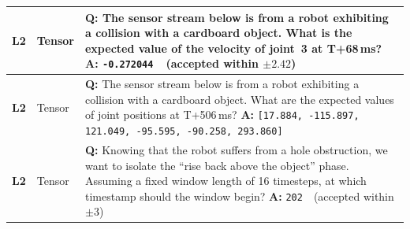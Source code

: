 \documentclass{article}
\begin{document}
\begin{small}
\begin{longtable}{@{}>{\raggedright\arraybackslash}p{}>{\raggedright\arraybackslash}p{}>{\raggedright\arraybackslash}p{}@{}}
        \textbf{L2}    & Tensor                 &
        \textbf{Q:} The sensor stream below is from a robot exhibiting a collision with a cardboard object. What is the expected value of the velocity of joint~3 at T+68\,ms? \newline
        \textbf{A:} \texttt{-0.272044}~~(accepted within $\pm2.42$)                                                                                                               \\
        \midrule

        \textbf{L2}    & Tensor                 &
        \textbf{Q:} The sensor stream below is from a robot exhibiting a collision with a cardboard object. What are the expected values of joint positions at T+506\,ms? \newline
        \textbf{A:} \texttt{[17.884, -115.897, 121.049, -95.595, -90.258, 293.860]}                                                                                               \\
        \midrule

        \textbf{L2}    & Tensor                 &
        \textbf{Q:} Knowing that the robot suffers from a hole obstruction, we want to isolate the ``rise back above the object'' phase. Assuming a fixed window length of 16 timesteps, at which timestamp should the window begin? \newline
        \textbf{A:} \texttt{202}~~(accepted within $\pm3$)                                                                                                                        \\
        \midrule


\end{longtable}
\end{small}
\end{document}

